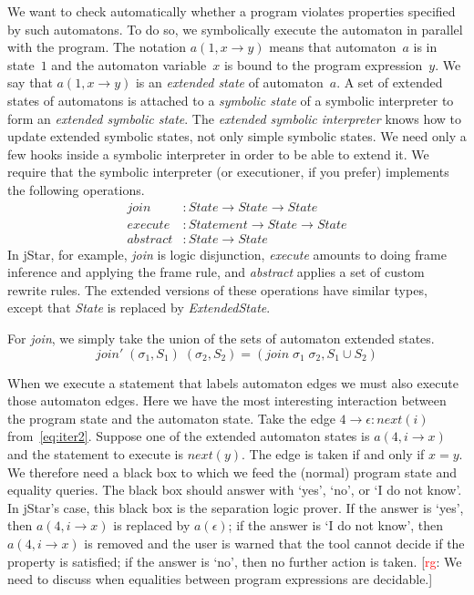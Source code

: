\documentclass[a4paper]{article}
\newcommand{\rg}[1]{\todo{rg}{#1}}
\newcommand{\todo}[2]{{\small [\textcolor{red}{#1}: #2]}}
\theoremstyle{slanted}
\theoremstyle{definition}
\theoremstyle{remark}
\begin{document}
We want to check automatically whether a program violates properties specified by such automatons.
To do so, we symbolically execute the automaton in parallel with the program.
The notation $a(1, x\to y)$ means that automaton~$a$ is in state~$1$ and the automaton variable~$x$ is bound to the program expression~$y$.
We say that $a(1,x\to y)$ is an \emph{extended state} of automaton~$a$.
A set of extended states of automatons is attached to a \emph{symbolic state} of a symbolic interpreter to form an \emph{extended symbolic state}.
The \emph{extended symbolic interpreter} knows how to update extended symbolic states, not only simple symbolic states.
We need only a few hooks inside a symbolic interpreter in order to be able to extend it.
We require that the symbolic interpreter (or executioner, if you prefer) implements the following operations.
\begin{align}
\mathit{join} &: \mathit{State} \to \mathit{State} \to \mathit{State} \\
\mathit{execute} &: \mathit{Statement} \to \mathit{State} \to \mathit{State} \\
\mathit{abstract} &: \mathit{State} \to \mathit{State}
\end{align}
In jStar, for example, \textit{join} is logic disjunction, \textit{execute} amounts to doing frame inference and applying the frame rule, and \textit{abstract} applies a set of custom rewrite rules.
The extended versions of these operations have similar types, except that \textit{State} is replaced by \textit{ExtendedState}.

For \textit{join}, we simply take the union of the sets of automaton extended states.
  \[ \mathit{join}'\;(\sigma_1, S_1)\;(\sigma_2,S_2)=
    (\mathit{join}\;\sigma_1\;\sigma_2, S_1\cup S_2) \]

When we execute a statement that labels automaton edges we must also execute those automaton edges.
Here we have the most interesting interaction between the program state and the automaton state.
Take the edge $4\to\epsilon:\mathit{next}(i)$ from~\eqref{eq:iter2}.
Suppose one of the extended automaton states is $a(4,i\to x)$ and the statement to execute is $\mathit{next}(y)$.
The edge is taken if and only if $x=y$.
We therefore need a black box to which we feed the (normal) program state and equality queries.
The black box should answer with `yes', `no', or `I do not know'.
In jStar's case, this black box is the separation logic prover.
If the answer is `yes', then $a(4,i\to x)$ is replaced by $a(\epsilon)$;
if the answer is `I do not know', then $a(4,i\to x)$ is removed and the user is warned that the tool cannot decide if the property is satisfied;
if the answer is `no', then no further action is taken.
\rg{We need to discuss when equalities between program expressions are decidable.}
\end{document}

